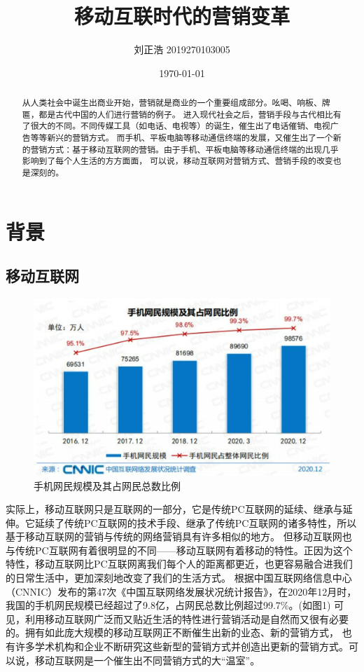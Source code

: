 \documentclass[a4paper]{article}
\title{\heiti\zihao{2} 移动互联时代的营销变革}
\author{\songti 刘正浩 2019270103005}
\date{\today}
\begin{document}
	\maketitle
	\thispagestyle{empty}

\begin{abstract}
	从人类社会中诞生出商业开始，营销就是商业的一个重要组成部分。吆喝、响板、牌匾，都是古代中国的人们进行营销的例子。
	进入现代社会之后，营销手段与古代相比有了很大的不同。不同传媒工具（如电话、电视等）的诞生，催生出了电话催销、电视广告等等新兴的营销方式。
	而手机、平板电脑等移动通信终端的发展，又催生出了一个新的营销方式：基于移动互联网的营销。由于手机、平板电脑等移动通信终端的出现几乎影响到了每个人生活的方方面面，
	可以说，移动互联网对营销方式、营销手段的改变也是深刻的。
\end{abstract}

\tableofcontents
\newpage

\section{背景}
	\subsection{移动互联网}
		\begin{figure}[htbp]
			\centering
			\includegraphics[scale=0.25]{1.png}
			\caption{手机网民规模及其占网民总数比例}
		\end{figure}
		实际上，移动互联网只是互联网的一部分，它是传统PC互联网的延续、继承与延伸。它延续了传统PC互联网的技术手段、继承了传统PC互联网的诸多特性，所以基于移动互联网的营销与传统的网络营销具有许多相似的地方。
		但移动互联网也与传统PC互联网有着很明显的不同——移动互联网有着移动的特性。正因为这个特性，移动互联网比PC互联网离我们每个人的距离都更近，也更容易融合进我们的日常生活中，更加深刻地改变了我们的生活方式。
		根据中国互联网络信息中心（CNNIC）发布的第47次《中国互联网络发展状况统计报告》，在2020年12月时，我国的手机网民规模已经超过了9.8亿，占网民总数比例超过99.7\%。(如图1)
		可见，利用移动互联网广泛而又贴近生活的特性进行营销活动是自然而又很有必要的。拥有如此庞大规模的移动互联网正不断催生出新的业态、新的营销方式，
		也有许多学术机构和企业不断研究这些新型的营销方式并创造出更新的营销方式。可以说，移动互联网是一个催生出不同营销方式的大“温室”。
		
\end{document}
